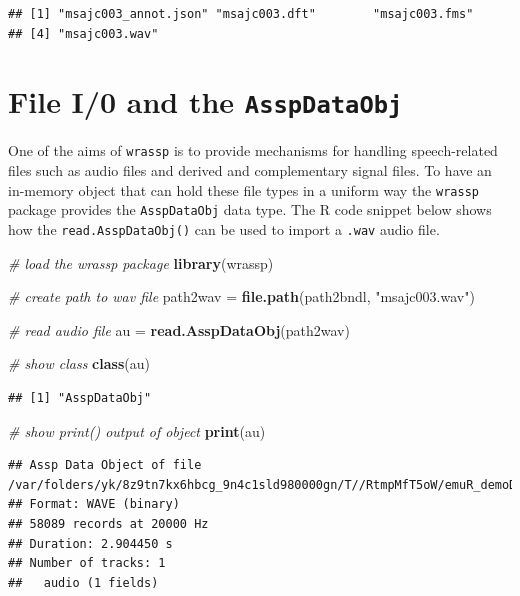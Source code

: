 \documentclass[]{book}
\newenvironment{Shaded}{\begin{snugshade}}{\end{snugshade}}
\newcommand{\CommentTok}[1]{\textcolor[rgb]{0.56,0.35,0.01}{\textit{#1}}}
\newcommand{\KeywordTok}[1]{\textcolor[rgb]{0.13,0.29,0.53}{\textbf{#1}}}
\newcommand{\NormalTok}[1]{#1}
\newcommand{\StringTok}[1]{\textcolor[rgb]{0.31,0.60,0.02}{#1}}
\begin{document}
\begin{verbatim}
## [1] "msajc003_annot.json" "msajc003.dft"        "msajc003.fms"       
## [4] "msajc003.wav"
\end{verbatim}

\hypertarget{file-i0-and-the-asspdataobj}{%
\section{\texorpdfstring{File I/0 and the \texttt{AsspDataObj}}{File I/0 and the AsspDataObj}}\label{file-i0-and-the-asspdataobj}}

One of the aims of \texttt{wrassp} is to provide mechanisms for handling speech-related files such as audio files and derived and complementary signal files. To have an in-memory object that can hold these file types in a uniform way the \texttt{wrassp} package provides the \texttt{AsspDataObj} data type. The R code snippet below shows how the \texttt{read.AsspDataObj()} can be used to import a \texttt{.wav} audio file.

\begin{Shaded}
\begin{Highlighting}[]
\CommentTok{# load the wrassp package}
\KeywordTok{library}\NormalTok{(wrassp)}

\CommentTok{# create path to wav file}
\NormalTok{path2wav =}\StringTok{ }\KeywordTok{file.path}\NormalTok{(path2bndl, }\StringTok{"msajc003.wav"}\NormalTok{)}

\CommentTok{# read audio file}
\NormalTok{au =}\StringTok{ }\KeywordTok{read.AsspDataObj}\NormalTok{(path2wav)}

\CommentTok{# show class}
\KeywordTok{class}\NormalTok{(au)}
\end{Highlighting}
\end{Shaded}

\begin{verbatim}
## [1] "AsspDataObj"
\end{verbatim}

\begin{Shaded}
\begin{Highlighting}[]
\CommentTok{# show print() output of object}
\KeywordTok{print}\NormalTok{(au)}
\end{Highlighting}
\end{Shaded}

\begin{verbatim}
## Assp Data Object of file /var/folders/yk/8z9tn7kx6hbcg_9n4c1sld980000gn/T//RtmpMfT5oW/emuR_demoData/ae_emuDB/0000_ses/msajc003_bndl/msajc003.wav.
## Format: WAVE (binary)
## 58089 records at 20000 Hz
## Duration: 2.904450 s
## Number of tracks: 1 
##   audio (1 fields)
\end{verbatim}
\end{document}
